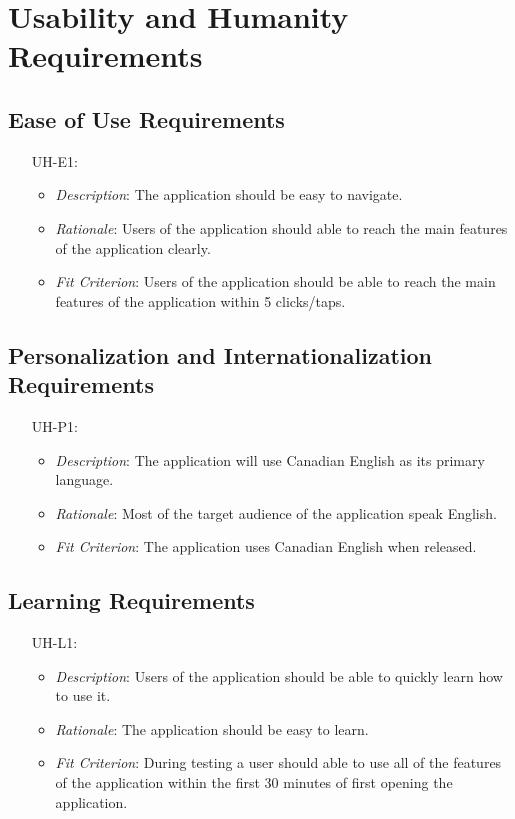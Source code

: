 \documentclass[12pt]{article}
\begin{document}
\section{Usability and Humanity Requirements}
\subsection{Ease of Use Requirements}

\noindent \begin{itemize}
    \item[UH-E1:] 
    \begin{itemize}
        \item \textit{Description}: The application should be easy to navigate.
        \item \textit{Rationale}: Users of the application should able to reach the main features of the application clearly.
        \item \textit{Fit Criterion}: Users of the application should be able to reach the main features of the application within 5 clicks/taps.
    \end{itemize}
\end{itemize}

\subsection{Personalization and Internationalization Requirements}
\noindent \begin{itemize}
    \item[UH-P1:] 
    \begin{itemize}
        \item \textit{Description}: The application will use Canadian English as its primary language.
        \item \textit{Rationale}: Most of the target audience of the application speak English.
        \item \textit{Fit Criterion}: The application uses Canadian English when released.
    \end{itemize}
\end{itemize}

\subsection{Learning Requirements}
\noindent \begin{itemize}
    \item[UH-L1:] 
    \begin{itemize}
        \item \textit{Description}: Users of the application should be able to quickly learn how to use it.
        \item \textit{Rationale}: The application should be easy to learn.
        \item \textit{Fit Criterion}: During testing a user should able to use all of the features of the application within the first 30 minutes of first opening the application.
    \end{itemize}
\end{itemize}
\end{document}
